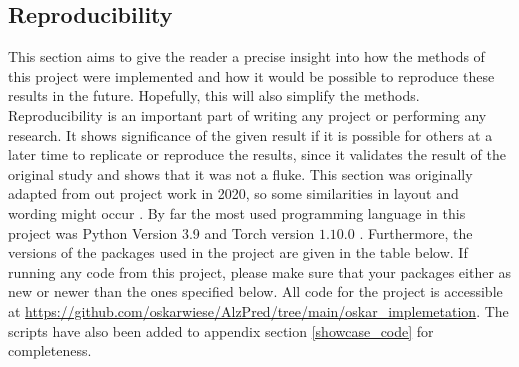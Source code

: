 \documentclass[12pt, fleqn, titlepage]{article}
\newcommand{\1}[1]{\mathds{1}\left[#1\right]}
\begin{document}
\subsection{Reproducibility}\label{reproducibility}
This section aims to give the reader a precise insight into how the methods of this project were implemented and how it would be possible to reproduce these results in the future. Hopefully, this will also simplify the methods. Reproducibility is an important part of writing any project or performing any research. It shows significance of the given result if it is possible for others at a later time to replicate or reproduce the results, since it validates the result of the original study and shows that it was not a fluke. This section was originally adapted from out project work in 2020, so some similarities in layout and wording might occur \cite{fagproject}. By far the most used programming language in this project was Python Version 3.9 and Torch version $ 1.10.0 $ \cite{python, pytorch}.
Furthermore, the versions of the packages used in the project are given in the table below. If running any code from this project, please make sure that your packages either as new or newer than the ones specified below. All code for the project is accessible at \url{https://github.com/oskarwiese/AlzPred/tree/main/oskar_implemetation}.
 The scripts have also been added to appendix section \ref{showcase_code} for completeness.
\end{document}
